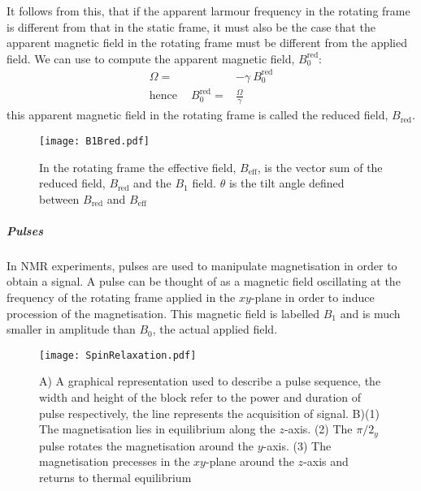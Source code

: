 It follows from this, that if the apparent larmour frequency in the rotating frame is different from that in the static frame, it must also be the case that the apparent magnetic field in the rotating frame must be different from the applied
field. We can use  to compute the apparent magnetic field, $B^{\text{red}}_0$:
\begin{align}\label{eqn:redB}
  \Omega =& -\gamma~B^{\text{red}}_0\\
\text{hence}\quad~B^{\text{red}}_0 =& \frac{\Omega}{\gamma}
\end{align}
this apparent magnetic field in the rotating frame is called the reduced field, $B_{\text{red}}$.

\begin{figure}
  \begin{center}
  \texttt{[image: B1Bred.pdf]}
  \end{center}
  \caption{In the rotating frame the effective field, $B_{\text{eff}}$, is the vector sum of the reduced field,
  $B_{\text{red}}$ and the $B_1$ field. $\theta$ is the tilt angle defined between $B_{\text{red}}$ and $B_{\text{eff}}$}
  \label{fig:BMag}
\end{figure}


\subparagraph{Pulses}

In NMR experiments, pulses are used to manipulate magnetisation in order to obtain a signal. A pulse can be
thought of as a magnetic field oscillating at the frequency of the rotating frame
applied in the $xy$-plane in order to induce procession of the magnetisation. This magnetic field is labelled $B_1$ and is much smaller in amplitude than $B_0$, the actual applied field.

\begin{figure}
  \begin{center}
  \texttt{[image: SpinRelaxation.pdf]}
  \end{center}
  \caption{A) A graphical representation used to describe a pulse sequence, the width and height of the block
  refer to the power and duration of pulse respectively, the line represents the acquisition of signal. B)(1) The
  magnetisation lies in equilibrium along the $z$-axis. (2)  The $\pi/2_y$ pulse rotates the magnetisation around the $y$-axis. (3) The magnetisation precesses in the $xy$-plane around the $z$-axis and returns to thermal equilibrium}
  \label{fig:Pulse}
\end{figure}

